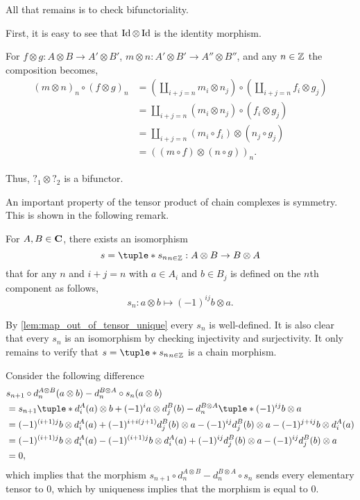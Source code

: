\begin{remark}
    All that remains is to check bifunctoriality.

    First, it is easy to see that \( \operatorname{Id} \otimes \operatorname{Id} \) is the identity morphism.
    
    For \( f \otimes g: A \otimes B \to A' \otimes B' \), \( m \otimes n: A' \otimes B' \to A'' \otimes B'' \), and any \( n \in {\mathbb{Z}} \) the composition becomes,
    \begin{align*}
        (m \otimes n)_n \circ (f \otimes g)_n &= (\coprod_{i + j = n} m_i \otimes n_j) \circ (\coprod_{i + j = n} f_i \otimes g_j) \\
        &= \coprod_{i + j = n} (m_i \otimes n_j) \circ (f_i \otimes g_j) \\
        &= \coprod_{i + j = n} (m_i \circ f_i) \otimes (n_j \circ g_j) \\
        &= ((m \circ f) \otimes (n \circ g))_n.
    \end{align*}

    Thus, \( ?_1 \otimes ?_2 \) is a bifunctor.
\end{remark}

An important property of the tensor product of chain complexes is symmetry. This is shown in the following remark.

\begin{remark}
    \label{rem:symmetry_tensor_product_of_chain_complex}
    For \( A, B \in \operatorname{\mathbf{C}} \), there exists an isomorphism
    \[
        s = \tuple*{s_n}_{n \in \Zb}: A \otimes B \to B \otimes A
    \]
    that for any \( n \) and \( i + j = n \) with \( a \in A_i \) and \( b \in B_j \) is defined on the \( n \)th component as follows,
    \[
        s_n: a \otimes b \mapsto (-1)^{ij} b \otimes a.
    \]

    By \autoref{lem:map_out_of_tensor_unique} every \( s_n \) is well-defined. It is also clear that every \( s_n \) is an isomorphism by checking injectivity and surjectivity. It only remains to verify that \( s = \tuple*{s_n}_{n \in \Zb} \) is a chain morphism.

    Consider the following difference
    \begin{align*}
        &s_{n + 1} \circ d_n^{A \otimes B}(a \otimes b) - d_n^{B \otimes A} \circ s_n (a \otimes b) \\
        &= s_{n + 1} \tuple*{d_i^A(a) \otimes b + (-1)^i a \otimes d_j^B(b)} - d_n^{B \otimes A} \tuple*{ (-1)^{ij} b \otimes a } \\
        &= (-1)^{(i + 1)j} b \otimes d_i^A(a) + (-1)^{i + i(j + 1)} d_j^B(b) \otimes a - (-1)^{ij} d_j^B(b) \otimes a - (-1)^{j + ij} b \otimes d_i^A(a) \\
        &= (-1)^{(i + 1)j} b \otimes d_i^A(a) - (-1)^{(i + 1)j} b \otimes d_i^A(a) + (-1)^{ij} d_j^B(b) \otimes a - (-1)^{ij} d_j^B(b) \otimes a \\
        &= 0,
    \end{align*}
    which implies that the morphism \( s_{n + 1} \circ d_n^{A \otimes B} - d_n^{B \otimes A} \circ s_n \) sends every elementary tensor to \( 0 \), which by uniqueness implies that the morphism is equal to \( 0 \).
\end{remark}

